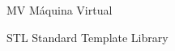 \begin{siglas}
  \item[MV]   Máquina Virtual 
  \item[STL]  Standard Template Library 
\end{siglas}
